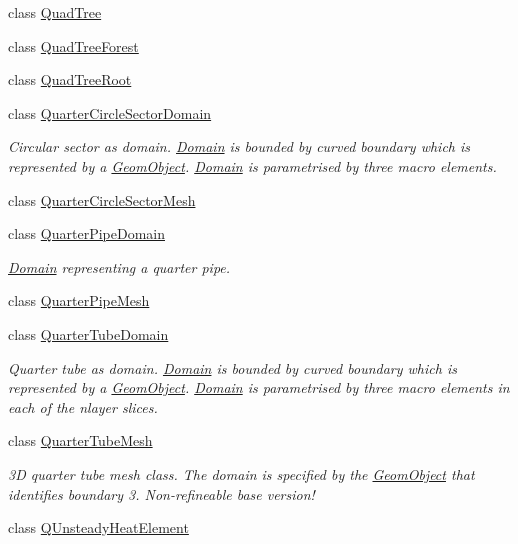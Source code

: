 \begin{DoxyCompactItemize}
class \hyperlink{classoomph_1_1QuadTree}{Quad\+Tree}
\item 
class \hyperlink{classoomph_1_1QuadTreeForest}{Quad\+Tree\+Forest}
\item 
class \hyperlink{classoomph_1_1QuadTreeRoot}{Quad\+Tree\+Root}
\item 
class \hyperlink{classoomph_1_1QuarterCircleSectorDomain}{Quarter\+Circle\+Sector\+Domain}
\begin{DoxyCompactList}\small\item\em Circular sector as domain. \hyperlink{classoomph_1_1Domain}{Domain} is bounded by curved boundary which is represented by a \hyperlink{classoomph_1_1GeomObject}{Geom\+Object}. \hyperlink{classoomph_1_1Domain}{Domain} is parametrised by three macro elements. \end{DoxyCompactList}\item 
class \hyperlink{classoomph_1_1QuarterCircleSectorMesh}{Quarter\+Circle\+Sector\+Mesh}
\item 
class \hyperlink{classoomph_1_1QuarterPipeDomain}{Quarter\+Pipe\+Domain}
\begin{DoxyCompactList}\small\item\em \hyperlink{classoomph_1_1Domain}{Domain} representing a quarter pipe. \end{DoxyCompactList}\item 
class \hyperlink{classoomph_1_1QuarterPipeMesh}{Quarter\+Pipe\+Mesh}
\item 
class \hyperlink{classoomph_1_1QuarterTubeDomain}{Quarter\+Tube\+Domain}
\begin{DoxyCompactList}\small\item\em Quarter tube as domain. \hyperlink{classoomph_1_1Domain}{Domain} is bounded by curved boundary which is represented by a \hyperlink{classoomph_1_1GeomObject}{Geom\+Object}. \hyperlink{classoomph_1_1Domain}{Domain} is parametrised by three macro elements in each of the nlayer slices. \end{DoxyCompactList}\item 
class \hyperlink{classoomph_1_1QuarterTubeMesh}{Quarter\+Tube\+Mesh}
\begin{DoxyCompactList}\small\item\em 3D quarter tube mesh class. The domain is specified by the \hyperlink{classoomph_1_1GeomObject}{Geom\+Object} that identifies boundary 3. Non-\/refineable base version! \end{DoxyCompactList}\item 
class \hyperlink{classoomph_1_1QUnsteadyHeatElement}{Q\+Unsteady\+Heat\+Element}

\end{DoxyCompactItemize}
